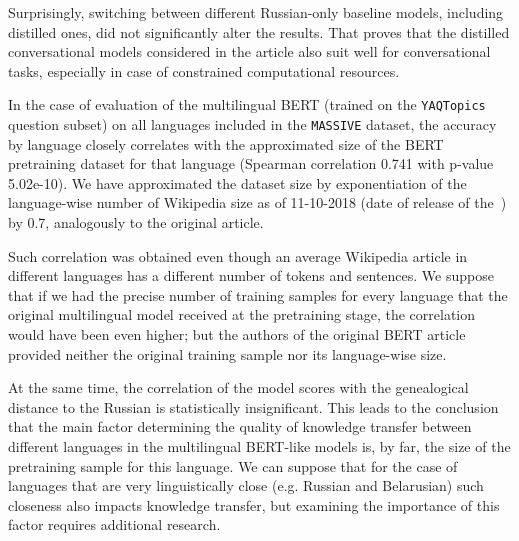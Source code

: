 Surprisingly, switching between different Russian-only baseline models, including distilled ones, did not significantly alter the results. That proves that the distilled conversational models considered in the article also suit well for conversational tasks, especially in case of constrained computational resources.

In the case of evaluation of the multilingual BERT (trained on the \texttt{YAQTopics} question subset) on all languages included in the \texttt{MASSIVE} dataset, the accuracy by language closely correlates with the approximated size of the BERT pretraining dataset for that language (Spearman correlation 0.741 with p-value 5.02e-10). We have approximated the dataset size by exponentiation of the language-wise number of Wikipedia size as of 11-10-2018 (date of release of the~\cite{bert}) by 0.7, analogously to the original article. 

 Such correlation was obtained even though an average Wikipedia article in different languages has a different number of tokens and sentences. We suppose that if we had the precise number of training samples for every language that the original multilingual model received at the pretraining stage, the correlation would have been even higher; but the authors of the original BERT article provided neither the original training sample nor its language-wise size. 

 At the same time, the correlation of the model scores with the genealogical distance to the Russian is statistically insignificant. This leads to the conclusion that the main factor determining the quality of knowledge transfer between different languages in the multilingual BERT-like models is, by far, the size of the pretraining sample for this language. We can suppose that for the case of languages that are very linguistically close (e.g. Russian and Belarusian) such closeness also impacts knowledge transfer, but examining the importance of this factor requires additional research. 

